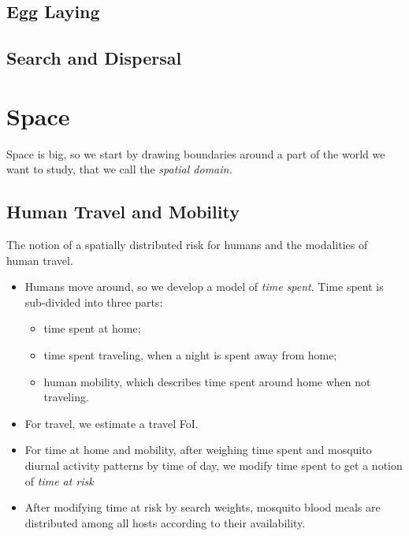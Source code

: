 \documentclass[
]{book}
\begin{document}
\hypertarget{egg-laying}{%
\subsection{Egg Laying}\label{egg-laying}}

\hypertarget{search-and-dispersal}{%
\subsection{Search and Dispersal}\label{search-and-dispersal}}

\hypertarget{space}{%
\section{Space}\label{space}}

Space is big, so we start by drawing boundaries around a part of the world we want to study, that we call the \emph{spatial domain.}

\hypertarget{human-travel-and-mobility}{%
\subsection{Human Travel and Mobility}\label{human-travel-and-mobility}}

The notion of a spatially distributed risk for humans and the modalities of human travel.

\begin{itemize}
\item
  Humans move around, so we develop a model of \emph{time spent}. Time spent is sub-divided into three parts:

  \begin{itemize}
  \item
    time spent at home;
  \item
    time spent traveling, when a night is spent away from home;
  \item
    human mobility, which describes time spent around home when not traveling.
  \end{itemize}
\item
  For travel, we estimate a travel FoI.
\item
  For time at home and mobility, after weighing time spent and mosquito diurnal activity patterns by time of day, we modify time spent to get a notion of \emph{time at risk}
\item
  After modifying time at risk by search weights, mosquito blood meals are distributed among all hosts according to their availability.
\end{itemize}
\end{document}
